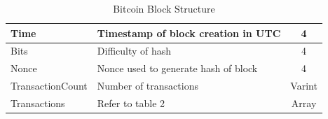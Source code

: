 \documentclass[a4paper,12pt]{article}
\begin{document}
{{\begin{table}[H]
\begin{tabular}{|l|l|l|c|}
		Time                                                & \multicolumn{2}{l|}{Timestamp of block creation in UTC}                                                                                            & 4                                                      \\ \hline
		Bits                                                & \multicolumn{2}{l|}{Difficulty of hash}                                                                                                            & 4                                                      \\ \hline
		Nonce                                               & \multicolumn{2}{l|}{Nonce used to generate hash of block}                                                                                          & 4                                                      \\ \hline
		TransactionCount                                    & \multicolumn{2}{l|}{Number of transactions}                                                                                                        & Varint                                                 \\ \hline
		Transactions                                        & \multicolumn{2}{l|}{Refer to table 2}                                                                                                              & Array                                                  \\ \hline
	\end{tabular}
	\caption[Bitcoin Block Structure]{Bitcoin Block Structure}
\label{blockstruct}
\end{table}

}}
\end{document}

